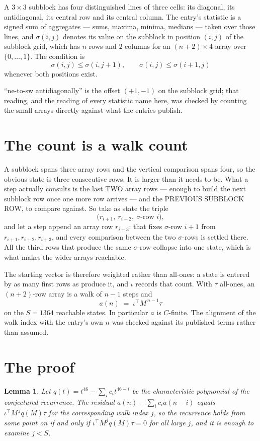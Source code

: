 \documentclass[11pt,a4paper]{article}
\theoremstyle{plain}
\newtheorem{lemma}[theorem]{Lemma}
\theoremstyle{definition}
\begin{document}
A $3\times3$ subblock has four distinguished lines of three cells: its diagonal, its
antidiagonal, its central row and its central column. The entry's statistic is a signed sum of
aggregates --- sums, maxima, minima, medians --- taken over those lines, and $\sigma(i,j)$
denotes its value on the subblock in position $(i,j)$ of the subblock grid, which has $n$ rows
and $2$ columns for an $(n+2)\times4$ array over $\{0,\dots,1\}$. The condition is
\[
\sigma(i,j)\le\sigma(i,j+1),\qquad \sigma(i,j)\le\sigma(i+1,j)
\]
whenever both positions exist.

``ne-to-sw antidiagonally'' is the offset $(+1,-1)$ on the subblock grid; that reading, and
the reading of every statistic name here, was checked by counting the small arrays directly
against what the entries publish.

\section{The count is a walk count}

A subblock spans three array rows and the vertical comparison spans four, so the obvious state
is three consecutive rows. It is larger than it needs to be. What a step actually consults is
the last TWO array rows --- enough to build the next subblock row once one more row arrives ---
and the PREVIOUS SUBBLOCK ROW, to compare against. So take as state the triple
\[
\bigl(r_{i+1},\ r_{i+2},\ \sigma\text{-row }i\bigr),
\]
and let a step append an array row $r_{i+3}$: that fixes $\sigma$-row $i+1$ from
$r_{i+1},r_{i+2},r_{i+3}$, and every comparison between the two $\sigma$-rows is settled
there. All the third rows that produce the same $\sigma$-row collapse into one state, which is
what makes the wider arrays reachable.

The starting vector is therefore weighted rather than all-ones: a state is entered by as many
first rows as produce it, and $\iota$ records that count. With $\tau$ all-ones, an
$(n+2)$-row array is a walk of $n-1$ steps and
\[
a(n)\;=\;\iota^{\!\top}M^{\,n-1}\tau
\]
on the $S=1364$ reachable states. In particular $a$ is $C$-finite. The alignment of the walk
index with the entry's own $n$ was checked against its published terms rather than assumed.

\section{The proof}

\begin{lemma}\label{lem:crit}
Let $q(t)=t^{46}-\sum_i c_it^{46-i}$ be the characteristic polynomial of the
conjectured recurrence. The residual $a(n)-\sum_ic_ia(n-i)$ equals
$\iota^{\!\top}M^{\,j}q(M)\tau$ for the corresponding walk index $j$, so the recurrence
holds from some point on if and only if $\iota^{\!\top}M^{j}q(M)\tau=0$ for all large $j$,
and it is enough to examine $j<S$.
\end{lemma}
\end{document}
